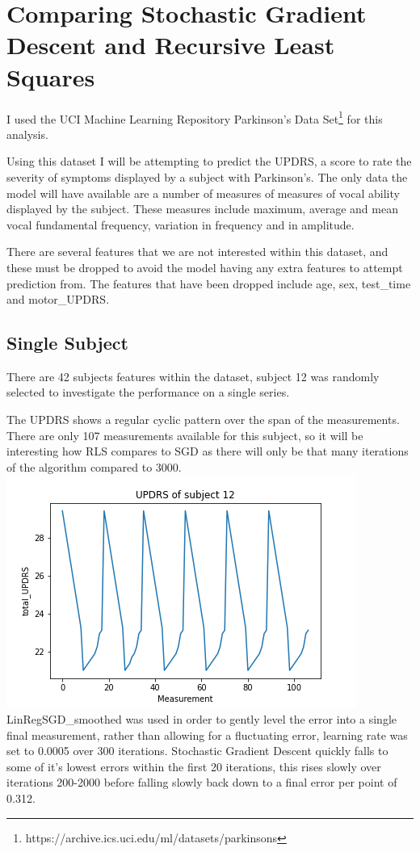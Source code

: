 \section{Comparing Stochastic Gradient Descent and Recursive Least Squares}

I used the UCI Machine Learning Repository Parkinson's Data Set\footnote{https://archive.ics.uci.edu/ml/datasets/parkinsons} for this analysis.

Using this dataset I will be attempting to predict the UPDRS, a score to rate the severity of symptoms displayed by a subject with Parkinson's. The only data the model will have available are a number of measures of measures of vocal ability displayed by the subject. These measures include maximum, average and mean vocal fundamental frequency, variation in frequency and in amplitude.

There are several features that we are not interested within this dataset, and these must be dropped to avoid the model having any extra features to attempt prediction from. The features that have been dropped include age, sex, test\_time and motor\_UPDRS.
\subsection{Single Subject}
There are 42 subjects features within the dataset, subject 12 was randomly selected to investigate the performance on a single series.

The UPDRS shows a regular cyclic pattern over the span of the measurements. There are only 107 measurements available for this subject, so it will be interesting how RLS compares to SGD as there will only be that many iterations of the algorithm compared to 3000.
\includegraphics[width=\linewidth]{figs/Parks true single.png}
LinRegSGD\_smoothed was used in order to gently level the error into a single final measurement, rather than allowing for a fluctuating error, learning rate was set to 0.0005 over 300 iterations.
Stochastic Gradient Descent quickly falls to some of it's lowest errors within the first 20 iterations, this rises slowly over iterations 200-2000 before falling slowly back down to a final error per point of 0.312.

